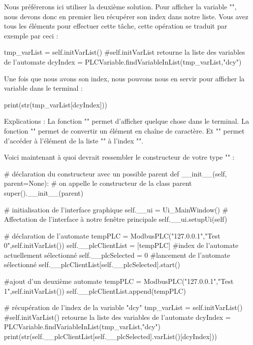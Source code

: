 \documentclass[12pt]{report}    %
\begin{document}
Nous préférerons ici utiliser la deuxième solution. Pour afficher la variable "", nous devons donc en premier lieu récupérer son index dans notre liste. Vous avez tous les éléments pour effectuer cette tâche, cette opération se traduit par exemple par ceci :
\begin{pyCode}
tmp_varList = self.initVarList()
#self.initVarList retourne la liste des variables de l'automate
dcyIndex = PLCVariable.findVariableInList(tmp_varList,"dcy")
\end{pyCode}
Une fois que nous avons son index, nous pouvons nous en servir pour afficher la variable dans le terminal :
\begin{pyCode}
print(str(tmp_varList[dcyIndex]))
\end{pyCode}
Explications :\newline
La fonction "" permet d'afficher quelque chose dans le terminal.\newline
La fonction "" permet de convertir un élément en chaîne de caractère.\newline
Et "" permet d'accéder à l'élément de la liste "" à l'index "".\smallSkip








Voici maintenant à quoi devrait ressembler le constructeur de votre type "" :
\begin{pyCode}

	# déclaration du constructeur avec un possible parent
	def __init__(self, parent=None):
        # on appelle le constructeur de la class parent
        super().__init__(parent)

        # initialisation de l’interface graphique
        self.__ui = Ui_MainWindow()
        # Affectation de l’interface à notre fenêtre principale
        self.__ui.setupUi(self)

        # déclaration de l’automate
        tempPLC = ModbusPLC("127.0.0.1","Test 0",self.initVarList())
        self.__plcClientList = [tempPLC]    
		#index de l'automate actuellement sélectionné
        self.__plcSelected = 0
        #lancement de l'automate sélectionné
        self.__plcClientList[self.__plcSelected].start()

        #ajout d'un deuxième automate
        tempPLC = ModbusPLC("127.0.0.1","Test 1",self.initVarList())
        self.__plcClientList.append(tempPLC)

        # récupération de l’index de la variable "dcy"
        tmp_varList = self.initVarList()
        #self.initVarList() retourne la liste des variables de l'automate
        dcyIndex = PLCVariable.findVariableInList(tmp_varList,"dcy")
        print(str(self.__plcClientList[self.__plcSelected].varList()[dcyIndex]))

\end{pyCode}
\smallSkip
\end{document}
